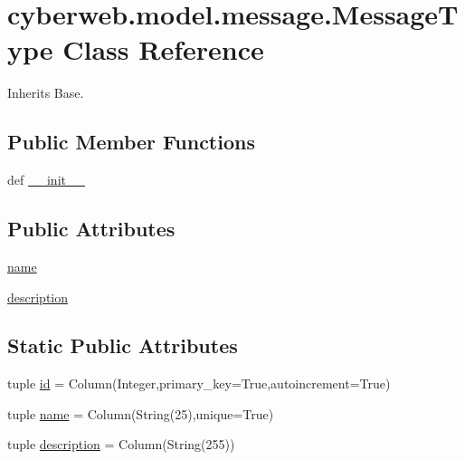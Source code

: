 \hypertarget{classcyberweb_1_1model_1_1message_1_1_message_type}{\section{cyberweb.\-model.\-message.\-Message\-Type \-Class \-Reference}
\label{classcyberweb_1_1model_1_1message_1_1_message_type}
}


\-Inherits \-Base.

\subsection*{\-Public \-Member \-Functions}
\begin{DoxyCompactItemize}
\item 
def \hyperlink{classcyberweb_1_1model_1_1message_1_1_message_type_a89595cc4be5cb78ae0a59aec6427aba8}{\-\_\-\-\_\-init\-\_\-\-\_\-}
\end{DoxyCompactItemize}
\subsection*{\-Public \-Attributes}
\begin{DoxyCompactItemize}
\item 
\hyperlink{classcyberweb_1_1model_1_1message_1_1_message_type_aa1689f841518e6a5268ac0bb4759c60f}{name}
\item 
\hyperlink{classcyberweb_1_1model_1_1message_1_1_message_type_ada1087507915583bfb0de9255e3d965b}{description}
\end{DoxyCompactItemize}
\subsection*{\-Static \-Public \-Attributes}
\begin{DoxyCompactItemize}
\item 
tuple \hyperlink{classcyberweb_1_1model_1_1message_1_1_message_type_af14a338a86ec821453f8f3361ef00664}{id} = \-Column(\-Integer,primary\-\_\-key=\-True,autoincrement=\-True)
\item 
tuple \hyperlink{classcyberweb_1_1model_1_1message_1_1_message_type_a7365dd3f4bf5875b4fc8a6d3b29c0d47}{name} = \-Column(\-String(25),unique=\-True)
\item 
tuple \hyperlink{classcyberweb_1_1model_1_1message_1_1_message_type_acdc069860425d5d61ac16806495cc1b4}{description} = \-Column(\-String(255))
\end{DoxyCompactItemize}


